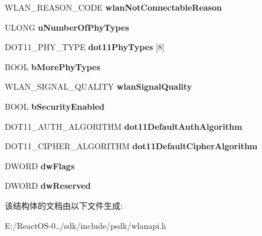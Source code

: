 \begin{DoxyCompactItemize}
W\+L\+A\+N\+\_\+\+R\+E\+A\+S\+O\+N\+\_\+\+C\+O\+DE {\bfseries wlan\+Not\+Connectable\+Reason}
\item 
\mbox{\label{struct___w_l_a_n___a_v_a_i_l_a_b_l_e___n_e_t_w_o_r_k_a2c3bf6cf4049d19599b0421c02f7b2ae}} 
U\+L\+O\+NG {\bfseries u\+Number\+Of\+Phy\+Types}
\item 
\mbox{\label{struct___w_l_a_n___a_v_a_i_l_a_b_l_e___n_e_t_w_o_r_k_a9df3dbb3978f313a87e39c852054dbf8}} 
D\+O\+T11\+\_\+\+P\+H\+Y\+\_\+\+T\+Y\+PE {\bfseries dot11\+Phy\+Types} \mbox{[}8\mbox{]}
\item 
\mbox{\label{struct___w_l_a_n___a_v_a_i_l_a_b_l_e___n_e_t_w_o_r_k_ad1b1c1f69261594fe8dd21905a723122}} 
B\+O\+OL {\bfseries b\+More\+Phy\+Types}
\item 
\mbox{\label{struct___w_l_a_n___a_v_a_i_l_a_b_l_e___n_e_t_w_o_r_k_ab0de6f18ca1fa4cb1093e4c1635674bf}} 
W\+L\+A\+N\+\_\+\+S\+I\+G\+N\+A\+L\+\_\+\+Q\+U\+A\+L\+I\+TY {\bfseries wlan\+Signal\+Quality}
\item 
\mbox{\label{struct___w_l_a_n___a_v_a_i_l_a_b_l_e___n_e_t_w_o_r_k_aa82a0103e0026a170ac97116a2cfe1a9}} 
B\+O\+OL {\bfseries b\+Security\+Enabled}
\item 
\mbox{\label{struct___w_l_a_n___a_v_a_i_l_a_b_l_e___n_e_t_w_o_r_k_a07fac12125307169f5f73fc785ebb1a6}} 
D\+O\+T11\+\_\+\+A\+U\+T\+H\+\_\+\+A\+L\+G\+O\+R\+I\+T\+HM {\bfseries dot11\+Default\+Auth\+Algorithm}
\item 
\mbox{\label{struct___w_l_a_n___a_v_a_i_l_a_b_l_e___n_e_t_w_o_r_k_ac7312052a8fface49a40f5d7ab258c76}} 
D\+O\+T11\+\_\+\+C\+I\+P\+H\+E\+R\+\_\+\+A\+L\+G\+O\+R\+I\+T\+HM {\bfseries dot11\+Default\+Cipher\+Algorithm}
\item 
\mbox{\label{struct___w_l_a_n___a_v_a_i_l_a_b_l_e___n_e_t_w_o_r_k_a34b42b2254c29a6d866e01c8cff805e9}} 
D\+W\+O\+RD {\bfseries dw\+Flags}
\item 
\mbox{\label{struct___w_l_a_n___a_v_a_i_l_a_b_l_e___n_e_t_w_o_r_k_ae8ab3b04823a0aa3e2055d07205830f0}} 
D\+W\+O\+RD {\bfseries dw\+Reserved}
\end{DoxyCompactItemize}


该结构体的文档由以下文件生成\+:\begin{DoxyCompactItemize}
\item 
E\+:/\+React\+O\+S-\/0../sdk/include/psdk/wlanapi.\+h\end{DoxyCompactItemize}
